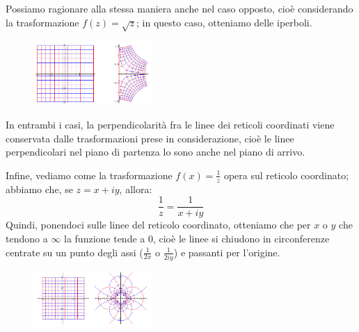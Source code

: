 Possiamo ragionare alla stessa maniera anche nel caso opposto, cioè considerando la trasformazione $f(z)=\sqrt{z}$; in questo caso, otteniamo delle iperboli.

\begin{figure}[h!]
  \centering
    \includegraphics[width=0.4\textwidth]{immagini/quadrattto.png}
\end{figure}

In entrambi i casi, la perpendicolarità fra le linee dei reticoli coordinati viene conservata dalle trasformazioni prese in considerazione, cioè le linee perpendicolari nel piano di partenza lo sono anche nel piano di arrivo.

Infine, vediamo come la trasformazione $f(x)=\frac{1}{z}$ opera sul reticolo coordinato; abbiamo che, se $z=x+iy$, allora:
$$\frac{1}{z}=\frac{1}{x+iy}$$
Quindi, ponendoci sulle linee del reticolo coordinato, otteniamo che per $x$ o $y$ che tendono a $\infty$ la funzione tende a 0, cioè le linee si chiudono in circonferenze centrate su un punto degli assi ($\frac{1}{2x}$ o $ \frac{1}{2iy}$) e  passanti per l'origine.

\begin{figure}[h!]
  \centering
    \includegraphics[width=0.4\textwidth]{immagini/inverso.png}
\end{figure}
